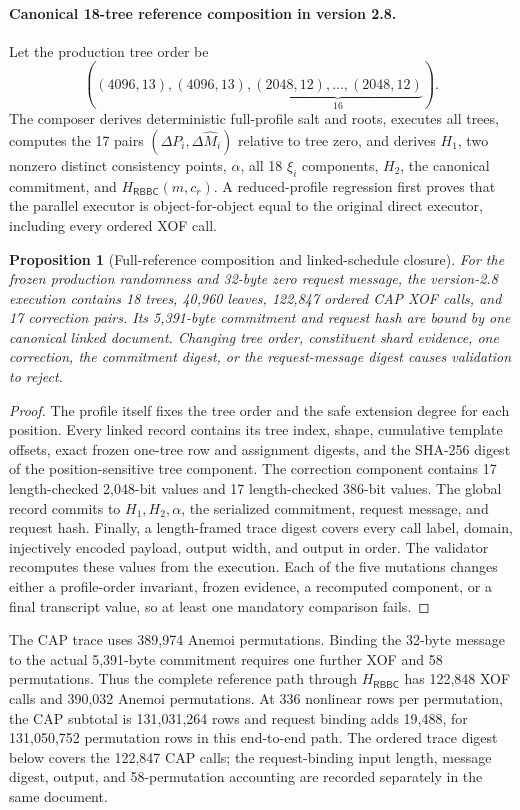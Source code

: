 \documentclass[11pt]{article}
\newtheorem{proposition}[definition]{Proposition}
\newcommand{\RBBC}{\mathsf{RBBC}}
\begin{document}
\paragraph{Canonical 18-tree reference composition in version 2.8.}
Let the production tree order be
\[
 ((4096,13),(4096,13),\underbrace{(2048,12),\ldots,(2048,12)}_{16}).
\]
The composer derives deterministic full-profile salt and roots, executes all
trees, computes the 17 pairs $(\Delta P_i,\Delta\widehat M_i)$ relative to tree
zero, and derives $H_1$, two nonzero distinct consistency points, $\alpha$,
all 18 $\xi_i$ components, $H_2$, the canonical commitment, and
$H_{\RBBC}(m,c_r)$.  A reduced-profile regression first proves that the
parallel executor is object-for-object equal to the original direct executor,
including every ordered XOF call.

\begin{proposition}[Full-reference composition and linked-schedule closure]
For the frozen production randomness and 32-byte zero request message, the
version-2.8 execution contains 18 trees, 40,960 leaves, 122,847 ordered CAP XOF
calls, and 17 correction pairs.  Its 5,391-byte commitment and request hash are
bound by one canonical linked document.  Changing tree order, constituent
shard evidence, one correction, the commitment digest, or the request-message
digest causes validation to reject.
\end{proposition}
\begin{proof}
The profile itself fixes the tree order and the safe extension degree for each
position.  Every linked record contains its tree index, shape, cumulative
template offsets, exact frozen one-tree row and assignment digests, and the
SHA-256 digest of the position-sensitive tree component.  The correction
component contains 17 length-checked 2,048-bit values and 17 length-checked
386-bit values.  The global record commits to $H_1,H_2,\alpha$, the serialized
commitment, request message, and request hash.  Finally, a length-framed trace
digest covers every call label, domain, injectively encoded payload, output
width, and output in order.  The validator recomputes these values from the
execution.  Each of the five mutations changes either a profile-order
invariant, frozen evidence, a recomputed component, or a final transcript
value, so at least one mandatory comparison fails.
\end{proof}

The CAP trace uses 389,974 Anemoi permutations.  Binding the 32-byte message to
the actual 5,391-byte commitment requires one further XOF and 58 permutations.
Thus the complete reference path through $H_{\RBBC}$ has 122,848 XOF calls and
390,032 Anemoi permutations.  At 336 nonlinear rows per permutation, the CAP
subtotal is 131,031,264 rows and request binding adds 19,488, for 131,050,752
permutation rows in this end-to-end path.  The ordered trace digest below covers the
122,847 CAP calls; the request-binding input length, message digest, output, and
58-permutation accounting are recorded separately in the same document.
\end{document}
